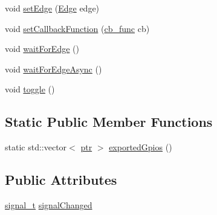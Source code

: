 \begin{DoxyCompactItemize}
\item 
void \hyperlink{classo_cpt_1_1protocol_1_1gpio_a026c5bceb1bff0328c2804d2748f8e3d}{set\+Edge} (\hyperlink{classo_cpt_1_1protocol_1_1gpio_adbbd34b2bc4394ad5a71d94641dda9f9}{Edge} edge)
\item 
void \hyperlink{classo_cpt_1_1protocol_1_1gpio_a9eb9df34a1e1aee22c47a8642c34eec0}{set\+Callback\+Function} (\hyperlink{classo_cpt_1_1protocol_1_1gpio_ad553926a5fc9db445e7c9715abede2e3}{cb\+\_\+func} cb)
\item 
void \hyperlink{classo_cpt_1_1protocol_1_1gpio_a0fd140f4fb32047ceba4a9a17891efe0}{wait\+For\+Edge} ()
\item 
void \hyperlink{classo_cpt_1_1protocol_1_1gpio_a02375f321f838da5f738eda8631ae0cc}{wait\+For\+Edge\+Async} ()
\item 
void \hyperlink{classo_cpt_1_1protocol_1_1gpio_a12c30093a002734375b29de19809aab0}{toggle} ()
\end{DoxyCompactItemize}
\subsection*{Static Public Member Functions}
\begin{DoxyCompactItemize}
\item 
static std\+::vector$<$ \hyperlink{classo_cpt_1_1protocol_1_1gpio_acd4fb0fba7a813a8013511b374e73900}{ptr} $>$ \hyperlink{classo_cpt_1_1protocol_1_1gpio_a2beacd45b177eb627e66a3b252a4aaff}{exported\+Gpios} ()
\end{DoxyCompactItemize}
\subsection*{Public Attributes}
\begin{DoxyCompactItemize}
\item 
\hyperlink{classo_cpt_1_1protocol_1_1gpio_aa875802b20c7ef999c44af68e7f23621}{signal\+\_\+t} \hyperlink{classo_cpt_1_1protocol_1_1gpio_aa24b7c7d759f783bc3e93745edc69a2b}{signal\+Changed}
\end{DoxyCompactItemize}
